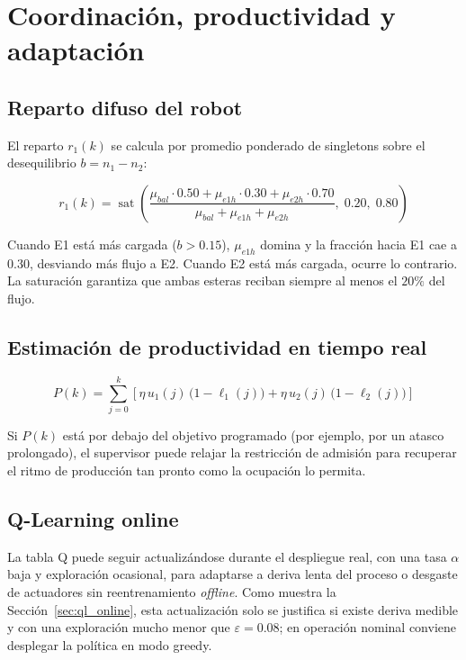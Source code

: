 \section{Coordinación, productividad y adaptación}

\subsection*{Reparto difuso del robot}

El reparto $r_1(k)$ se calcula por promedio ponderado de singletons sobre el desequilibrio $b=n_1-n_2$:

\[
r_1(k) = \operatorname{sat}\!\left(\frac{\mu_{bal} \cdot 0.50 + \mu_{e1h} \cdot 0.30 + \mu_{e2h} \cdot 0.70}{\mu_{bal} + \mu_{e1h} + \mu_{e2h}},\;0.20,\;0.80\right)
\]

Cuando E1 está más cargada ($b>0.15$), $\mu_{e1h}$ domina y la fracción hacia E1 cae a $0.30$, desviando más flujo a E2. Cuando E2 está más cargada, ocurre lo contrario. La saturación garantiza que ambas esteras reciban siempre al menos el $20\%$ del flujo.

\subsection*{Estimación de productividad en tiempo real}

\[
P(k) = \sum_{j=0}^{k}\!\left[\eta\,u_1(j)\,\bigl(1-\ell_1(j)\bigr) + \eta\,u_2(j)\,\bigl(1-\ell_2(j)\bigr)\right]
\]

Si $P(k)$ está por debajo del objetivo programado (por ejemplo, por un atasco prolongado), el supervisor puede relajar la restricción de admisión para recuperar el ritmo de producción tan pronto como la ocupación lo permita.

\subsection*{Q-Learning online}

La tabla Q puede seguir actualizándose durante el despliegue real, con una tasa $\alpha$ baja y exploración ocasional, para adaptarse a deriva lenta del proceso o desgaste de actuadores sin reentrenamiento \emph{offline}. Como muestra la Sección~\ref{sec:ql_online}, esta actualización solo se justifica si existe deriva medible y con una exploración mucho menor que $\varepsilon=0.08$; en operación nominal conviene desplegar la política en modo greedy.
